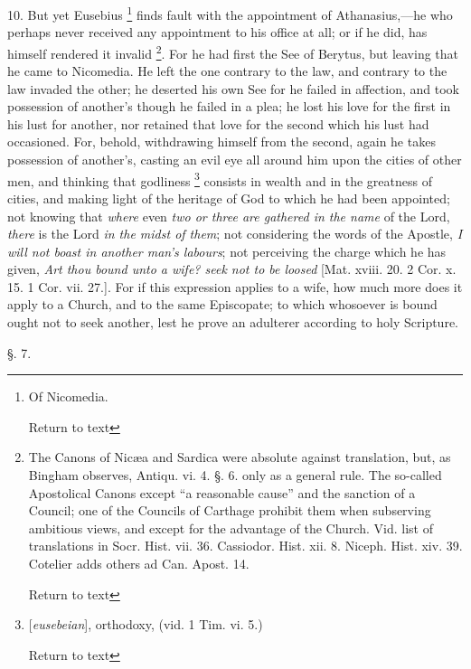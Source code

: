 10. But yet Eusebius \footnote{Of Nicomedia.

Return to text} finds fault with the appointment of Athanasius,—he who
perhaps never received any appointment to his office at all; or
if he did, has himself rendered it invalid \footnote{The Canons of Nicæa and Sardica were absolute against translation,
but, as Bingham observes, Antiqu. vi. 4. §. 6. only as a general
rule. The so-called Apostolical Canons except ``a reasonable cause'' and
the sanction of a Council; one of the Councils of Carthage prohibit
them when subserving ambitious views, and except for the advantage of
the Church. Vid. list of translations in Socr. Hist. vii. 36.
Cassiodor. Hist. xii. 8. Niceph. Hist. xiv. 39. Cotelier adds others
ad Can. Apost. 14.

Return to text}. For he had first the See of Berytus, but leaving that he came
to Nicomedia. He left the one contrary to the law, and contrary to the
law invaded the other; he deserted his own See for he failed in
affection, and took possession of another's though he failed in a
plea; he lost his love for the first in his lust for another, nor
retained that love for the second which his lust had occasioned. For,
behold, withdrawing himself from the second, again he takes possession
of another's, casting an evil eye all around him upon the cities of
other men, and thinking that godliness \footnote{[\emph{eusebeian}], orthodoxy, (vid. 1 Tim. vi. 5.)

Return to text} consists in wealth and in the greatness of cities, and making
light of the heritage of God to which he had been appointed; not
knowing that \emph{where} even \emph{two or three are gathered in the
name} of the Lord, \emph{there} is the Lord \emph{in the midst of them};
not considering the words of the Apostle, \emph{I will not boast in
another man's labours}; not perceiving the charge which he has
given, \emph{Art thou bound unto a wife? seek not to be loosed} [Mat.
xviii. 20. 2 Cor. x. 15. 1 Cor. vii. 27.]. For if this expression
applies to a wife, how much more does it apply to a Church, and to the
same Episcopate; to which whosoever is bound ought not to seek
another, lest he prove an adulterer according to holy Scripture.

§. 7.

